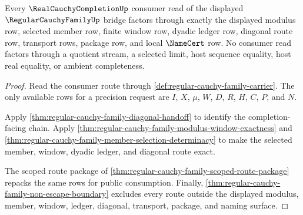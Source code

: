 \begin{theorem}
\label{thm:regular-cauchy-family-bridge-consumer-exactness}
Every $\RealCauchyCompletionUp$ consumer read of the displayed $\RegularCauchyFamilyUp$ bridge factors through exactly the displayed modulus row, selected member row, finite window row, dyadic ledger row, diagonal route row, transport rows, package row, and local $\NameCert$ row. No consumer read factors through a quotient stream, a selected limit, host sequence equality, host real equality, or ambient completeness.
\end{theorem}
\begin{proof}
Read the consumer route through \autoref{def:regular-cauchy-family-carrier}. The only available rows for a precision request are $I$, $X$, $\mu$, $W$, $D$, $R$, $H$, $C$, $P$, and $N$.

Apply \autoref{thm:regular-cauchy-family-diagonal-handoff} to identify the completion-facing chain. Apply \autoref{thm:regular-cauchy-family-modulus-window-exactness} and \autoref{thm:regular-cauchy-family-member-selection-determinacy} to make the selected member, window, dyadic ledger, and diagonal route exact.

The scoped route package of \autoref{thm:regular-cauchy-family-scoped-route-package} repacks the same rows for public consumption. Finally, \autoref{thm:regular-cauchy-family-non-escape-boundary} excludes every route outside the displayed modulus, member, window, ledger, diagonal, transport, package, and naming surface.
\end{proof}

